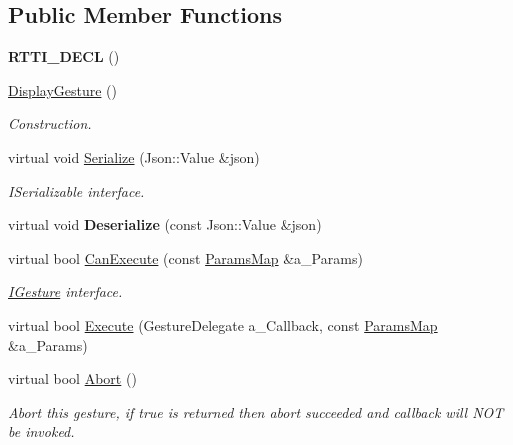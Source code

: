 \subsection*{Public Member Functions}
\begin{DoxyCompactItemize}
\item 
\mbox{\label{class_display_gesture_a4ee96e56a95a5898cb663fcd8dd35373}} 
{\bfseries R\+T\+T\+I\+\_\+\+D\+E\+CL} ()
\item 
\mbox{\label{class_display_gesture_a26b9a348bba896bfda9c3e3598c85fba}} 
\hyperlink{class_display_gesture_a26b9a348bba896bfda9c3e3598c85fba}{Display\+Gesture} ()
\begin{DoxyCompactList}\small\item\em Construction. \end{DoxyCompactList}\item 
\mbox{\label{class_display_gesture_a9276a10263e9c9b15efd2d9883f03e66}} 
virtual void \hyperlink{class_display_gesture_a9276a10263e9c9b15efd2d9883f03e66}{Serialize} (Json\+::\+Value \&json)
\begin{DoxyCompactList}\small\item\em I\+Serializable interface. \end{DoxyCompactList}\item 
\mbox{\label{class_display_gesture_a514f7d39f6e12ad451ad97a6e6a83c3e}} 
virtual void {\bfseries Deserialize} (const Json\+::\+Value \&json)
\item 
\mbox{\label{class_display_gesture_ad624cc5eb904d63176eb594fed336ade}} 
virtual bool \hyperlink{class_display_gesture_ad624cc5eb904d63176eb594fed336ade}{Can\+Execute} (const \hyperlink{class_params_map}{Params\+Map} \&a\+\_\+\+Params)
\begin{DoxyCompactList}\small\item\em \hyperlink{class_i_gesture}{I\+Gesture} interface. \end{DoxyCompactList}\item 
virtual bool \hyperlink{class_display_gesture_a85bd298434073aa8d384ccbf520ef221}{Execute} (Gesture\+Delegate a\+\_\+\+Callback, const \hyperlink{class_params_map}{Params\+Map} \&a\+\_\+\+Params)
\item 
\mbox{\label{class_display_gesture_a46ea9bd9b94cf7a4bd828c5eaa7c87ce}} 
virtual bool \hyperlink{class_display_gesture_a46ea9bd9b94cf7a4bd828c5eaa7c87ce}{Abort} ()
\begin{DoxyCompactList}\small\item\em Abort this gesture, if true is returned then abort succeeded and callback will N\+OT be invoked. \end{DoxyCompactList}\end{DoxyCompactItemize}
